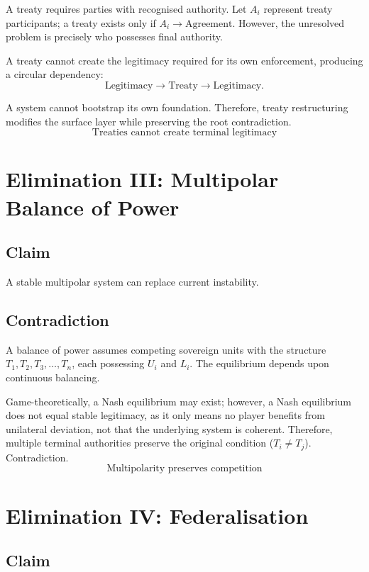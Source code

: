 \documentclass[11pt,openany]{book}
\theoremstyle{plain}
\theoremstyle{definition}
\begin{document}
A treaty requires parties with recognised authority. Let \(A_i\) represent treaty participants; a treaty exists only if \(A_i \to \text{Agreement}\). However, the unresolved problem is precisely who possesses final authority. 

A treaty cannot create the legitimacy required for its own enforcement, producing a circular dependency:
\[
\text{Legitimacy} \longrightarrow \text{Treaty} \longrightarrow \text{Legitimacy}.
\]

A system cannot bootstrap its own foundation. Therefore, treaty restructuring modifies the surface layer while preserving the root contradiction.
\[
\boxed{
\text{Treaties cannot create terminal legitimacy}
}
\]

\section*{Elimination III: Multipolar Balance of Power}

\subsection*{Claim}

A stable multipolar system can replace current instability.

\subsection*{Contradiction}

A balance of power assumes competing sovereign units with the structure \(T_1, T_2, T_3, \ldots, T_n\), each possessing \(U_i\) and \(L_i\). The equilibrium depends upon continuous balancing. 

Game-theoretically, a Nash equilibrium may exist; however, a Nash equilibrium does not equal stable legitimacy, as it only means no player benefits from unilateral deviation, not that the underlying system is coherent. Therefore, multiple terminal authorities preserve the original condition (\(T_i \neq T_j\)). Contradiction.
\[
\boxed{
\text{Multipolarity preserves competition}
}
\]

\section*{Elimination IV: Federalisation}

\subsection*{Claim}
\end{document}
